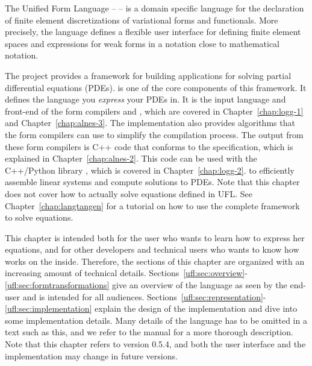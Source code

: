 \index{\ufl{}}

The Unified Form Language -- \ufl{} \citep{AlnaesLogg2009} --
is a domain specific language for the declaration of finite element
discretizations of variational forms and functionals. More precisely,
the language defines a flexible user interface for defining finite
element spaces and expressions for weak forms in a notation close to
mathematical notation.

The \fenics{} project provides a framework for building applications
for solving partial differential equations (PDEs).  \ufl{} is one of
the core components of this framework.  It defines the language you
\emph{express} your PDEs in.  It is the input language and front-end
of the form compilers \ffc{} and \sfc{}, which are covered in
Chapter~\ref{chap:logg-1} and Chapter~\ref{chap:alnes-3}.  The \ufl{}
implementation also provides algorithms that the form compilers can
use to simplify the compilation process.  The output from these form
compilers is C++ \citep{Stroustrup1997} code that conforms to the \ufc{}
specification, which is explained in Chapter~\ref{chap:alnes-2}.
This code can be used with the C++/Python library \dolfin{}, which
is covered in Chapter~\ref{chap:logg-2}.  to efficiently assemble
linear systems and compute solutions to PDEs.  Note that this chapter
does not cover how to actually solve equations defined in UFL. See
Chapter~\ref{chap:langtangen} for a tutorial on how to use the complete
\fenics{} framework to solve equations.

This chapter is intended both for the \fenics{} user who wants
to learn how to express her equations, and for other \fenics{}
developers and technical users who wants to know how \ufl{}
works on the inside.  Therefore, the sections of this chapter
are organized with an increasing amount of technical details.
Sections~\ref{ufl:sec:overview}-\ref{ufl:sec:formtransformations}
give an overview of the language as seen by
the end-user and is intended for all audiences.
Sections~\ref{ufl:sec:representation}-\ref{ufl:sec:implementation}
explain the design of the implementation and dive into some implementation
details.  Many details of the language has to be omitted in a text such
as this, and we refer to the \ufl{} manual \citep{AlnaesLogg2009} for
a more thorough description. Note that this chapter refers to \ufl{}
version 0.5.4, and both the user interface and the implementation may
change in future versions.

